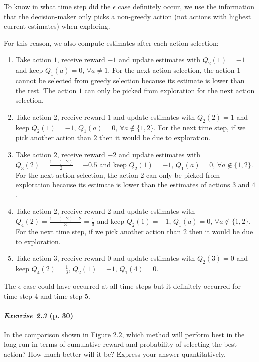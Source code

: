 \documentclass[10pt,a4paper]{article}
\begin{document}
To know in what time step did the $\epsilon$ case definitely occur, we use the information that the decision-maker only picks a non-greedy action (not actions with highest current estimates) when exploring.

For this reason, we also compute estimates after each action-selection:
\begin{enumerate}
\item Take action $1$, receive reward $-1$ and update estimates with $Q_2(1)=-1$ and keep $Q_1(a)=0,\, \forall a \neq 1$. For the next action selection, the action $1$ cannot be selected from greedy selection because its estimate is lower than the rest. The action $1$ can only be picked from exploration for the next action selection.

\item Take action $2$, receive reward $1$ and update estimates with $Q_2(2)=1$ and keep $Q_2(1)=-1,\, Q_1(a)=0,\, \forall a \notin \{1, 2\}$. For the next time step, if we pick another action than $2$ then it would be due to exploration.

\item Take action $2$, receive reward $-2$ and update estimates with $Q_3(2)=\frac{1 + (-2)}{2} = -0.5$ and keep $Q_2(1)=-1,\, Q_1(a)=0,\, \forall a \notin \{1, 2\}$. For the next action selection, the action $2$ can only be picked from exploration because its estimate is lower than the estimates of actions $3$ and $4$.

\item Take action $2$, receive reward $2$ and update estimates with $Q_4(2)=\frac{1 + (-2) + 2}{3} = \frac{1}{3}$ and keep $Q_2(1)=-1,\, Q_1(a)=0,\, \forall a \notin \{1, 2\}$. For the next time step, if we pick another action than $2$ then it would be due to exploration. 

\item Take action $3$, receive reward $0$ and update estimates with $Q_2(3)=0$ and keep $Q_4(2) = \frac{1}{3},\, Q_2(1)=-1,\, Q_1(4)=0$.

\end{enumerate}

The $\epsilon$ case could have occurred at all time steps but it definitely occurred  for time step $4$ and time step $5$.

\paragraph{\textit{Exercise 2.3} (p. 30)} In the comparison shown in Figure $2.2$, which method will perform best in
the long run in terms of cumulative reward and probability of selecting the best action?
How much better will it be? Express your answer quantitatively.
\end{document}
